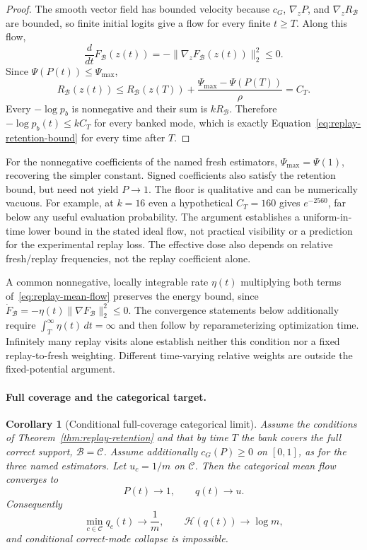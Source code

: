 \documentclass{article}
\newcommand{\1}{\mathbf 1}
\newtheorem{corollary}[lemma]{Corollary}
\theoremstyle{remark}
\theoremstyle{definition}
\theoremstyle{plain}
\begin{document}
\begin{proof}
The smooth vector field has bounded velocity because $c_G$,
$\nabla_zP$, and $\nabla_zR_{\mathcal B}$ are bounded, so finite initial
logits give a flow for every finite $t\ge T$. Along this flow,
\[
  \frac{d}{dt}F_{\mathcal B}(z(t))
  =-\lVert\nabla_zF_{\mathcal B}(z(t))\rVert_2^2\le0.
\]
Since $\Psi(P(t))\le\Psi_{\max}$,
\[
  R_{\mathcal B}(z(t))
  \le R_{\mathcal B}(z(T))
     +\frac{\Psi_{\max}-\Psi(P(T))}{\rho}
  =C_T.
\]
Every $-\log p_b$ is nonnegative and their sum is
$kR_{\mathcal B}$. Therefore
$-\log p_b(t)\le kC_T$ for every banked mode, which is exactly
Equation~\eqref{eq:replay-retention-bound} for every time after $T$.
\end{proof}


For the nonnegative coefficients of the named fresh estimators,
$\Psi_{\max}=\Psi(1)$, recovering the simpler constant. Signed coefficients
also satisfy the retention bound, but need not yield $P\to1$.
The floor is qualitative and can be numerically vacuous. For example, at
$k=16$ even a hypothetical $C_T=160$ gives $e^{-2560}$, far below any useful
evaluation probability. The argument establishes a uniform-in-time lower
bound in the stated ideal flow, not practical visibility or a prediction for
the experimental replay loss. The effective dose also depends on relative
fresh/replay frequencies, not the replay coefficient alone.

A common nonnegative, locally integrable rate $\eta(t)$ multiplying both
terms of~\eqref{eq:replay-mean-flow} preserves the energy bound, since
$\dot F_{\mathcal B}=-\eta(t)\|\nabla F_{\mathcal B}\|_2^2\le0$.
The convergence statements below additionally require
$\int_T^\infty\eta(t)\,dt=\infty$ and then follow by reparameterizing
optimization time. Infinitely many replay visits alone establish neither
this condition nor a fixed replay-to-fresh weighting. Different time-varying
relative weights are outside the fixed-potential argument.

\paragraph{Full coverage and the categorical target.}
\begin{corollary}[Conditional full-coverage categorical limit]
\label{cor:replay-no-collapse}
Assume the conditions of Theorem~\ref{thm:replay-retention} and that by time
$T$ the bank covers the full correct support, $\mathcal B=\mathcal C$.
Assume additionally $c_G(P)\ge0$ on $[0,1]$, as for the three named
estimators. Let
$u_c=1/m$ on $\mathcal C$. Then the categorical mean flow converges to
\[
  P(t)\longrightarrow1,
  \qquad q(t)\longrightarrow u.
\]
Consequently
\[
  \min_{c\in\mathcal C}q_c(t)\longrightarrow\frac1m,
  \qquad
  \mathcal H(q(t))\longrightarrow\log m,
\]
and conditional correct-mode collapse is impossible.
\end{corollary}
\end{document}
